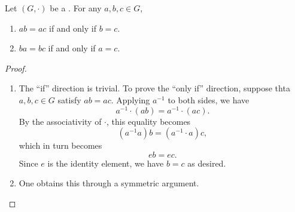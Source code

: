 \begin{lemma} \label{lemma:cancellation_law_for_group_operations}
    Let $(G,\cdot)$ be a . For any $a,b,c \in G$,
    \begin{enumerate}
        \item $ab = ac$ if and only if $b = c$.
        \item $ba = bc$ if and only if $a = c$.
    \end{enumerate}
\end{lemma}
\begin{proof}
    \begin{enumerate}
        \item The ``if'' direction is trivial. To prove the ``only if'' direction, suppose thta $a,b,c \in G$ satisfy $ab = ac$. Applying $a^{-1}$ to both sides, we have
        $$a^{-1} \cdot (ab) = a^{-1} \cdot (ac).$$
        By the associativity of $\cdot$, this equality becomes
        $$(a^{-1} a) b = (a^{-1} \cdot a)c,$$
        which in turn becomes
        $$e b = ec.$$
        Since $e$ is the identity element, we have $b = c$ as desired.
        \item One obtains this through a symmetric argument.
    \end{enumerate}
\end{proof}

